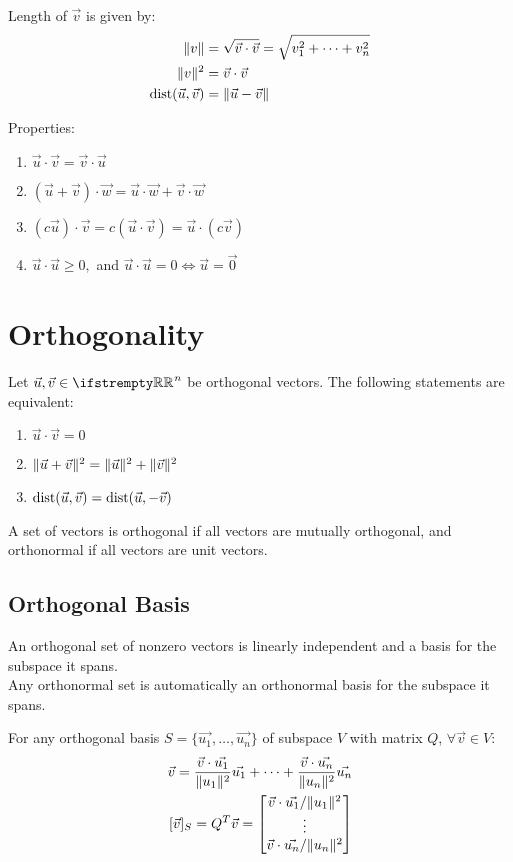 \documentclass[12pt, a4paper]{article}
\begin{document}
\begin{multicols*}{3}
Length of $\vec{v}$  is given by:
\begin{align*}
  \lVert v\rVert &= \sqrt{\vec{v}\cdot\vec{v}} = \sqrt{v^2_1 + \cdots + v^2_n}\\
  \lVert v\rVert^2 &= \vec{v}\cdot\vec{v}\\
  \operatorname{dist}(\vec{u}, \vec{v}) &= \lVert\vec{u} - \vec{v}\rVert
\end{align*}

Properties:
\begin{enumerate}[\roman*.]
  \item $\vec{u} \cdot \vec{v} = \vec{v} \cdot \vec{u}$
  \item $(\vec{u} + \vec{v}) \cdot \vec{w} = \vec{u} \cdot \vec{w} + \vec{v} \cdot \vec{w}$
  \item $(c \vec{u}) \cdot \vec{v} = c (\vec{u} \cdot \vec{v}) = \vec{u} \cdot (c \vec{v})$
  \item $\vec{u} \cdot \vec{u} \geq 0,$ and $\vec{u} \cdot \vec{u} = 0 \iff \vec{u} = \vec{0}$
\end{enumerate}
\colbreak

\section{Orthogonality}

Let $\vec{u}, \vec{v} \in \RR^n$ be orthogonal vectors. The following statements are equivalent:
\begin{enumerate}[\roman*.]
  \item $\vec{u} \cdot \vec{v} = 0$
  \item $\lVert\vec{u} + \vec{v}\rVert^2 = \lVert\vec{u}\rVert^2 + \lVert\vec{v}\rVert^2$
  \item $\operatorname{dist}(\vec{u}, \vec{v}) = \operatorname{dist}(\vec{u}, -\vec{v})$
\end{enumerate}

A set of vectors is orthogonal if all vectors are mutually orthogonal, and orthonormal if all vectors are unit vectors.

\subsection{Orthogonal Basis}
An orthogonal set of nonzero vectors is linearly independent and a basis for the subspace it spans.\\
Any orthonormal set is automatically an orthonormal basis for the subspace it spans.

For any orthogonal basis $S = \{\vec{u_1},\ldots,\vec{u_n}\}$ of subspace $V$ with matrix $Q$, $\forall \vec{v} \in V$:
\begin{align*}
  \vec{v} = \frac{\vec{v}\cdot\vec{u_1}}{\lVert u_1\rVert^2}\vec{u_1} + \cdots +  \frac{\vec{v}\cdot\vec{u_n}}{\lVert u_n\rVert^2}\vec{u_n}\\
  [\vec{v}]_S =  Q^T \vec{v} = 
  \begin{bmatrix}
    \vec{v} \cdot \vec{u_1} / \lVert u_1\rVert^2\\
    \vdots\\
    \vec{v} \cdot \vec{u_n} / \lVert u_n\rVert^2\\
  \end{bmatrix}
\end{align*}


\end{multicols*}
\end{document}

